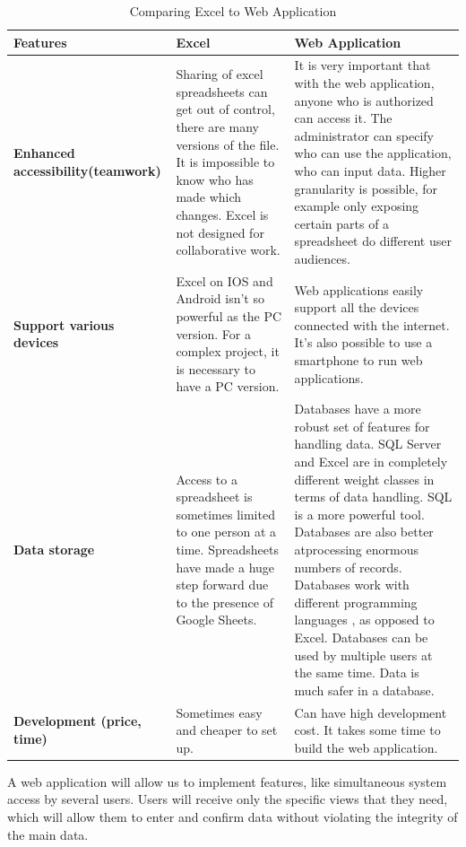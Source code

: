 \documentclass{scrartcl}
\begin{document}
\begin{table}[H]
\begin{center}
\begin{tabular}{| p{2.5cm}| p{6.5cm} |p{6.5cm}|}
\hline
\textbf{Features} & \textbf{Excel}& \textbf{Web Application} \\
\hline
\textbf{Enhanced accessibility(teamwork)}
   &              Sharing of excel spreadsheets can get out of control, there are many versions of the file. It is impossible to know who has made which changes. 
Excel is not designed for collaborative work.
& It is very important that with the web application, anyone who is authorized can access it. The administrator can specify who can use the application,
who can input data. Higher
granularity is possible, for example only exposing certain parts of a spreadsheet
do different user audiences.\\ \hline
\textbf{Support various devices}                   
&           Excel on IOS and Android isn’t so powerful as the PC version. For a
complex project, it is necessary to have a PC version.
	& Web applications easily support all the devices connected with
the internet. It’s also possible to use a smartphone to run web applications.\\ \hline
\textbf{Data storage}               
  &      Access to a spreadsheet is sometimes limited to one person at a time.
Spreadsheets have made a huge step forward due to the presence of Google Sheets.	
&  Databases have a more robust set of features for handling data. SQL
Server and Excel are in completely different weight classes in terms of data handling. SQL is a
more powerful tool. Databases are also better atprocessing enormous numbers of records.
 Databases work with different programming languages
, as opposed to Excel. Databases can be used by multiple users at the same
time.
Data is much safer in a database. \\ \hline
\textbf{Development (price, time)}
& Sometimes easy and cheaper to set up.
& Can have high development cost.
It takes some time to build the web application.\\ \hline
\end{tabular}
\end{center}
\caption{Comparing Excel to Web Application}
\label{table2}
\end{table}








A web application will allow us to implement features, like simultaneous system access by several users.
Users will receive only the specific views that they need, which will allow them to enter and confirm data without violating the integrity of the main data.
\end{document}
